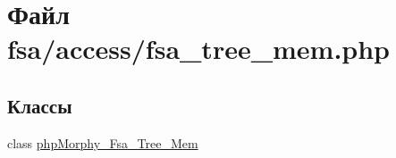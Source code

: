 \hypertarget{fsa__tree__mem_8php}{
\section{Файл fsa/access/fsa\_\-tree\_\-mem.php}
\label{fsa__tree__mem_8php}
}
\subsection*{Классы}
\begin{DoxyCompactItemize}
\item 
class \hyperlink{classphpMorphy__Fsa__Tree__Mem}{phpMorphy\_\-Fsa\_\-Tree\_\-Mem}
\end{DoxyCompactItemize}
